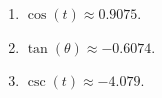 \begin{multicols}{3}

\begin{enumerate}
\setcounter{enumi}{\value{HW}}

\item  $\cos(t) \approx 0.9075$.  

\item $\tan(\theta) \approx - 0.6074$.  

\item  $\csc(t) \approx -4.079$.  

\setcounter{HW}{\value{enumi}}

\end{enumerate}

\end{multicols}


